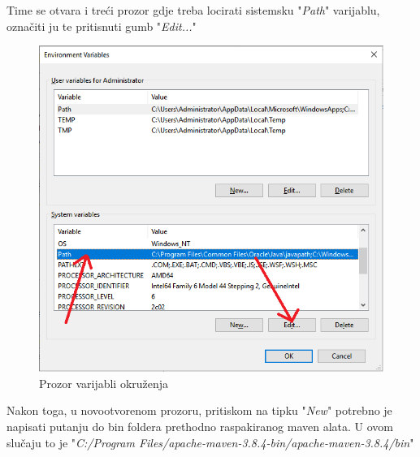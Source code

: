 			Time se otvara i treći prozor gdje treba locirati sistemsku "\textit{Path}" varijablu, označiti ju te pritisnuti gumb "\textit{Edit...}"
			
			\begin{figure}[H]
			\centering
			\includegraphics[width=\textwidth, scale=0.5]{slike/EnvironmentVariables}
			\caption{Prozor varijabli okruženja}
			\label{fig:EnvironmentVariables}
			\end{figure}
			
			Nakon toga, u novootvorenom prozoru, pritiskom na tipku "\textit{New}" potrebno je napisati putanju do bin foldera prethodno raspakiranog maven alata. U ovom slučaju to je "\textit{C:/Program Files/apache-maven-3.8.4-bin/apache-maven-3.8.4/bin}"
			
